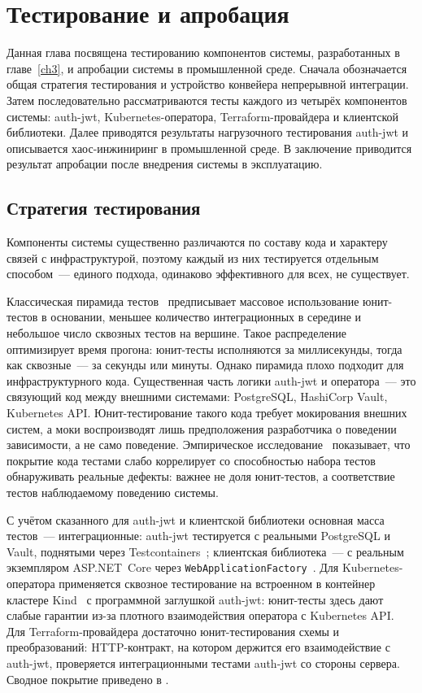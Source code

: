 \chapter{Тестирование и апробация}\label{ch4}

Данная глава посвящена тестированию компонентов системы,
разработанных в главе~\ref{ch3},
и апробации системы в промышленной среде.
Сначала обозначается общая стратегия тестирования
и устройство конвейера непрерывной интеграции.
Затем последовательно рассматриваются тесты каждого
из четырёх компонентов системы:
auth-jwt, Kubernetes-оператора, Terraform-провайдера
и клиентской библиотеки.
Далее приводятся результаты нагрузочного тестирования auth-jwt
и описывается хаос-инжиниринг в промышленной среде.
В заключение приводится результат апробации
после внедрения системы в эксплуатацию.

\section{Стратегия тестирования}\label{sec:ch4-strategy}

Компоненты системы существенно различаются по составу кода
и характеру связей с инфраструктурой, поэтому каждый из них
тестируется отдельным способом~--- единого подхода,
одинаково эффективного для всех, не существует.

Классическая пирамида тестов~\cite{Cohn2009}
предписывает массовое использование юнит-тестов в основании,
меньшее количество интеграционных в середине
и небольшое число сквозных тестов на вершине.
Такое распределение оптимизирует время прогона:
юнит-тесты исполняются за миллисекунды,
тогда как сквозные~--- за секунды или минуты.
Однако пирамида плохо подходит для инфраструктурного кода.
Существенная часть логики auth-jwt и оператора~---
это связующий код между внешними системами:
PostgreSQL, HashiCorp Vault, Kubernetes API.
Юнит-тестирование такого кода требует мокирования внешних систем,
а моки воспроизводят лишь предположения разработчика о поведении
зависимости, а не само поведение.
Эмпирическое исследование~\cite{InozemtsevaHolmes2014}
показывает, что покрытие кода тестами слабо коррелирует
со способностью набора тестов обнаруживать реальные дефекты:
важнее не доля юнит-тестов, а соответствие тестов
наблюдаемому поведению системы.

С учётом сказанного для auth-jwt и клиентской библиотеки
основная масса тестов~--- интеграционные:
auth-jwt тестируется с реальными PostgreSQL и Vault,
поднятыми через Testcontainers~\cite{Testcontainers};
клиентская библиотека~--- с реальным экземпляром ASP.NET~Core
через \texttt{WebApplicationFactory}~\cite{TestWebApplicationFactory}.
Для Kubernetes-оператора применяется сквозное тестирование
на встроенном в контейнер кластере Kind~\cite{Kind}
с программной заглушкой auth-jwt:
юнит-тесты здесь дают слабые гарантии из-за плотного взаимодействия
оператора с Kubernetes API.
Для Terraform-провайдера достаточно юнит-тестирования
схемы и преобразований: HTTP-контракт,
на котором держится его взаимодействие с auth-jwt,
проверяется интеграционными тестами auth-jwt
со стороны сервера.
Сводное покрытие приведено в .

